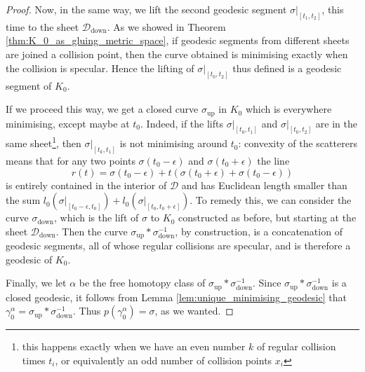 \documentclass[reqno,11pt]{amsart}
\begin{document}
\begin{proof}
    Now, in the same way, we lift the second geodesic segment \( \sigma\rvert_{[t_1, t_2]} \), this time to the sheet \( \mathcal{D}_\mathrm{down} \).
    As we showed in Theorem \ref{thm:K_0_as_gluing_metric_space}, if geodesic segments from different sheets are joined a collision point, then the curve obtained is minimising exactly when the collision is specular.
    Hence the lifting of \( \sigma\rvert_{[t_0, t_2]} \) thus defined is a geodesic segment of \( K_0 \).
    \par If we proceed this way, we get a closed curve \( \sigma_\mathrm{up} \) in \(K_0 \) which is everywhere minimising, except maybe at \( t_0 \).
    Indeed, if the lifts \( \sigma\rvert_{[t_0, t_1]} \) and \( \sigma\rvert_{[t_0, t_2]} \) are in the same sheet\footnote{
        this happens exactly when we have an even number \( k \) of regular collision times \( t_i \), or equivalently an odd number of collision points \( x_i \)
    },
    then \( \sigma\rvert_{[t_k, t_1]} \) is not minimising around \( t_0 \):
    convexity of the scatterers means that for any two points \( \sigma(t_0-\epsilon) \) and \( \sigma(t_0 + \epsilon) \) the line
    \[
        r(t) = \sigma(t_0-\epsilon) + t(\sigma(t_0+\epsilon) + \sigma(t_0-\epsilon)) 
    \]
    is entirely contained in the interior of \( \mathcal{D} \) and has Euclidean length smaller than the sum \( l_0(\sigma\rvert_{[t_0-\epsilon, t_0]}) + l_0(\sigma\rvert_{[t_0, t_0+\epsilon]}) \).
    To remedy this, we can consider the curve \( \sigma_\mathrm{down} \), which is the lift of \( \sigma \) to \( K_0 \) constructed as before, but starting at the sheet \( \mathcal{D}_\mathrm{down} \).
    Then the curve \( \sigma_\mathrm{up}\ast\sigma_\mathrm{down}^{-1} \), by construction, is a concatenation of geodesic segments, all of whose regular collisions are specular, and is therefore a geodesic of \( K_0 \).
    \par Finally, we let \( \alpha \) be the free homotopy class of \( \sigma_\mathrm{up}\ast\sigma_\mathrm{down}^{-1} \). 
    Since \( \sigma_\mathrm{up}\ast\sigma_\mathrm{down}^{-1} \) is a closed geodesic, it follows from Lemma \ref{lem:unique_minimising_geodesic} that \(\gamma^\alpha_0 = \sigma_\mathrm{up}\ast\sigma_\mathrm{down}^{-1} \).
    Thus \(p(\gamma^\alpha_0) = \sigma \), as we wanted.  
\end{proof}
\end{document}
